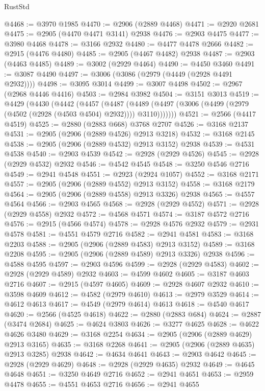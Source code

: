 \begin{lexlean}{RustStd}
\begin{coremodule}
@4468 := @3970 @1985
@4470 := @2906 (@2889 @4468)
@4471 := @2920 @2681
@4475 := @2905 (@4470 @4471 @3141) @2938
@4476 := @2903 @4475
@4477 := @3980 @4468
@4478 := @3166 @2932
@4480 := @4477 @4478 @2666
@4482 := @2915 (@4476 @4480)
@4485 := @2905 (@4467 @4482) @2938
@4487 := @2903 (@4463 @4485)
@4489 := @3002 (@2929 @4464)
@4490 := @4450 @3460
@4491 := @3087 @4490
@4497 := @3006 (@3086 (@2979 (@4449 (@2928 @4491 @2932))))
@4498 := @3095 @3014
@4499 := @3007 @4498
@4502 := @2967 (@2968 @4446 @4416)
@4503 := @2984 @3982
@4504 := @3151 @3013
@4519 := @4429
    (@4430
      (@4442
        (@4457
          (@4487
            (@4489 (@4497 (@3006 (@4499 (@2979 (@4502 (@2928 (@4503 @4504) @2932)))) @3110)))))))
@4521 := @2566 (@4417 @4519)
@4525 := @2880 (@2883 @668) @3768 @2707
@4526 := @3168 @2137
@4531 := @2905 (@2906 (@2889 @4526) @2913 @3218)
@4532 := @3168 @2145
@4538 := @2905 (@2906 (@2889 @4532) @2913 @3152) @2938
@4539 := @4531 @4538
@4540 := @2903 @4539
@4542 := @2928 (@2929 @4526)
@4545 := @2928 (@2929 @4532) @2932
@4546 := @4542 @4545
@4548 := @3250 @4546 @2716
@4549 := @2941 @4548
@4551 := @2923 (@2924 @1057)
@4552 := @3168 @2171
@4557 := @2905 (@2906 (@2889 @4552) @2913 @3152)
@4558 := @3168 @2179
@4564 := @2905 (@2906 (@2889 @4558) @2913 @3326) @2938
@4565 := @4557 @4564
@4566 := @2903 @4565
@4568 := @2928 (@2929 @4552)
@4571 := @2928 (@2929 @4558) @2932
@4572 := @4568 @4571
@4574 := @3187 @4572 @2716
@4576 := @2915 (@4566 @4574)
@4578 := @2928 @4576 @2932
@4579 := @2931 @4578
@4581 := @4551 @4579 @2716
@4582 := @2941 @4581
@4583 := @3168 @2203
@4588 := @2905 (@2906 (@2889 @4583) @2913 @3152)
@4589 := @3168 @2208
@4595 := @2905 (@2906 (@2889 @4589) @2913 @3326) @2938
@4596 := @4588 @4595
@4597 := @2903 @4596
@4599 := @2928 (@2929 @4583)
@4602 := @2928 (@2929 @4589) @2932
@4603 := @4599 @4602
@4605 := @3187 @4603 @2716
@4607 := @2915 (@4597 @4605)
@4609 := @2928 @4607 @2932
@4610 := @3598 @4609
@4612 := @4582 (@2979 @4610)
@4613 := @2979 @3529
@4614 := @4612 @4613
@4617 := @4549 (@2979 @4614) @4613
@4618 := @4540 @4617
@4620 := @2566 (@4525 @4618)
@4622 := @2880 (@2883 @684)
@4624 := @2887 (@3474 @2684)
@4625 := @4624 @3803
@4626 := @3277 @4625
@4628 := @4622 @4626 @3480
@4629 := @3168 @2254
@4634 := @2905 (@2906 (@2889 @4629) @2913 @3165)
@4635 := @3168 @2268
@4641 := @2905 (@2906 (@2889 @4635) @2913 @3285) @2938
@4642 := @4634 @4641
@4643 := @2903 @4642
@4645 := @2928 (@2929 @4629)
@4648 := @2928 (@2929 @4635) @2932
@4649 := @4645 @4648
@4651 := @3250 @4649 @2716
@4652 := @2941 @4651
@4653 := @2959 @4478
@4655 := @4551 @4653 @2716
@4656 := @2941 @4655

\end{coremodule}
\end{lexlean}
